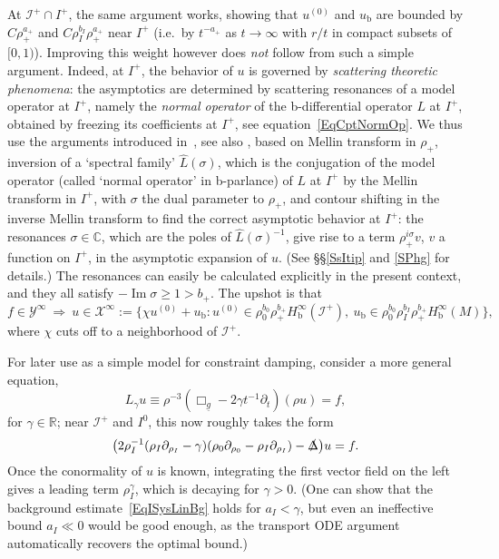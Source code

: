 \documentclass[reqno,11pt,letterpaper]{amsart}
\numberwithin{equation}{section}
\numberwithin{figure}{section}
\theoremstyle{definition}
\theoremstyle{remark}
\newcommand{\mc}{\mathcal}
\newcommand{\cX}{\mc X}
\newcommand{\cY}{\mc Y}
\newcommand{\ms}{\mathscr}
\newcommand{\scri}{\ms I}
\newcommand{\C}{\mathbb{C}}
\newcommand{\R}{\mathbb{R}}
\newcommand{\slDelta}{\slashed{\Delta}{}}
\renewcommand{\Im}{\operatorname{Im}}
\newcommand{\pa}{\partial}
\newcommand{\ul}[1]{\underline{#1}{}}
\newcommand{\wh}{\widehat}
\newcommand{\bop}{{\mathrm{b}}}
\newcommand{\Hb}{H_{\bop}}
\begin{document}
At $\scri^+\cap I^+$, the same argument works, showing that $u^{(0)}$ and $u_\bop$ are bounded by $C\rho_+^{a_+}$ and $C\rho_I^{b_I}\rho_+^{a_+}$ near $I^+$ (i.e.\ by $t^{-a_+}$ as $t\to\infty$ with $r/t$ in compact subsets of $[0,1)$). Improving this weight however does \emph{not} follow from such a simple argument. Indeed, at $I^+$, the behavior of $u$ is governed by \emph{scattering theoretic phenomena}: the asymptotics are determined by scattering resonances of a model operator at $I^+$, namely the \emph{normal operator} of the b-differential operator $L$ at $I^+$, obtained by freezing its coefficients at $I^+$, see equation~\eqref{EqCptNormOp}. We thus use the arguments introduced in~\cite{VasyMicroKerrdS}, see also \cite[Theorem~2.21]{HintzVasySemilinear}, based on Mellin transform in $\rho_+$, inversion of a `spectral family' $\wh{L}(\sigma)$, which is the conjugation of the model operator (called `normal operator' in b-parlance) of $L$ at $I^+$ by the Mellin transform in $I^+$, with $\sigma$ the dual parameter to $\rho_+$, and contour shifting in the inverse Mellin transform to find the correct asymptotic behavior at $I^+$: the resonances $\sigma\in\C$, which are the poles of $\wh{L}(\sigma)^{-1}$, give rise to a term $\rho_+^{i\sigma}v$, $v$ a function on $I^+$, in the asymptotic expansion of $u$. (See \S\S\ref{SsItip} and \ref{SPhg} for details.) The resonances can easily be calculated explicitly in the present context, and they all satisfy $-\!\Im\sigma\geq 1>b_+$. The upshot is that
\begin{equation}
\label{EqISysLinX}
  f \in \cY^\infty\ \Rightarrow\ u \in \cX^\infty := \bigl\{ \chi u^{(0)} + u_\bop \colon u^{(0)}\in\rho_0^{b_0}\rho_+^{b_+}\Hb^\infty(\scri^+),\ u_\bop\in\rho_0^{b_0}\rho_I^{b_I}\rho_+^{b_+}\Hb^\infty(M) \bigr\},
\end{equation}
where $\chi$ cuts off to a neighborhood of $\scri^+$.

For later use as a simple model for constraint damping, consider a more general equation,
\begin{equation}
\label{EqISysLinDamping}
  L_\gamma u \equiv \rho^{-3}(\Box_{\ul g} - 2\gamma t^{-1}\pa_t)(\rho u) = f,
\end{equation}
for $\gamma\in\R$; near $\scri^+$ and $I^0$, this now roughly takes the form
\[
  \bigl(2\rho_I^{-1}(\rho_I\pa_{\rho_I}-\gamma)(\rho_0\pa_{\rho_0}-\rho_I\pa_{\rho_I})-\slDelta\bigr)u = f.
\]
Once the conormality of $u$ is known, integrating the first vector field on the left gives a leading term $\rho_I^\gamma$, which is decaying for $\gamma>0$. (One can show that the background estimate~\eqref{EqISysLinBg} holds for $a_I<\gamma$, but even an ineffective bound $a_I\ll 0$ would be good enough, as the transport ODE argument automatically recovers the optimal bound.)
\end{document}

